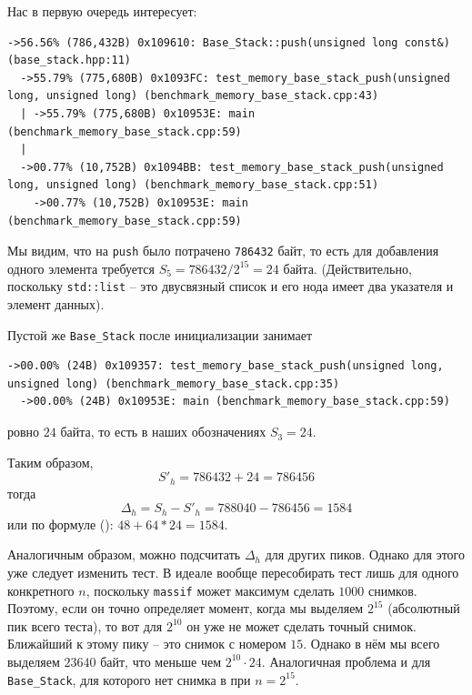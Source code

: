 Нас в первую очередь интересует:
\begin{lstlisting}[caption={}, label={}, style=style_code_block]
->56.56% (786,432B) 0x109610: Base_Stack::push(unsigned long const&) (base_stack.hpp:11)
  ->55.79% (775,680B) 0x1093FC: test_memory_base_stack_push(unsigned long, unsigned long) (benchmark_memory_base_stack.cpp:43)
  | ->55.79% (775,680B) 0x10953E: main (benchmark_memory_base_stack.cpp:59)
  |   
  ->00.77% (10,752B) 0x1094BB: test_memory_base_stack_push(unsigned long, unsigned long) (benchmark_memory_base_stack.cpp:51)
    ->00.77% (10,752B) 0x10953E: main (benchmark_memory_base_stack.cpp:59)
\end{lstlisting}      
Мы видим, что на \texttt{push} было потрачено \texttt{786432} байт, то есть для добавления одного элемента требуется \(S_5 = 786432/2^{15} = 24\) байта. (Действительно, поскольку \texttt{std::list} -- это двусвязный список и его нода имеет два указателя и элемент данных). 

Пустой же \texttt{Base_Stack} после инициализации занимает 
\begin{lstlisting}[caption={}, label={}, style=style_code_block]
->00.00% (24B) 0x109357: test_memory_base_stack_push(unsigned long, unsigned long) (benchmark_memory_base_stack.cpp:35)
  ->00.00% (24B) 0x10953E: main (benchmark_memory_base_stack.cpp:59)
\end{lstlisting}
ровно \(24\) байта, то есть в наших обозначениях \(S_3 = 24\).

Таким образом, 
\begin{dmath*}
  S'_h = 786432 + 24 = 786456 
\end{dmath*}
тогда
\begin{dmath*}
  \Delta_h = S_h - S'_h = 788040 - 786456 = 1584 
\end{dmath*}
или по формуле (): \(48 + 64*24 = 1584\).


Аналогичным образом, можно подсчитать \(\Delta_{h}\) для других пиков. Однако для этого уже следует изменить тест. В идеале вообще пересобирать тест лишь для одного конкретного \(n\), поскольку \texttt{massif} может максимум сделать \(1000\) снимков. Поэтому, если он точно определяет момент, когда мы выделяем \(2^15\) (абсолютный пик всего теста), то вот для \(2^{10}\) он уже не может сделать точный снимок. Ближайший к этому пику -- это снимок с номером \(15\). Однако в нём мы всего выделяем \(23640\) байт, что меньше чем \(2^{10} \cdot 24\). Аналогичная проблема и для \texttt{Base_Stack}, для которого нет снимка в при \(n = 2^{15}\).

